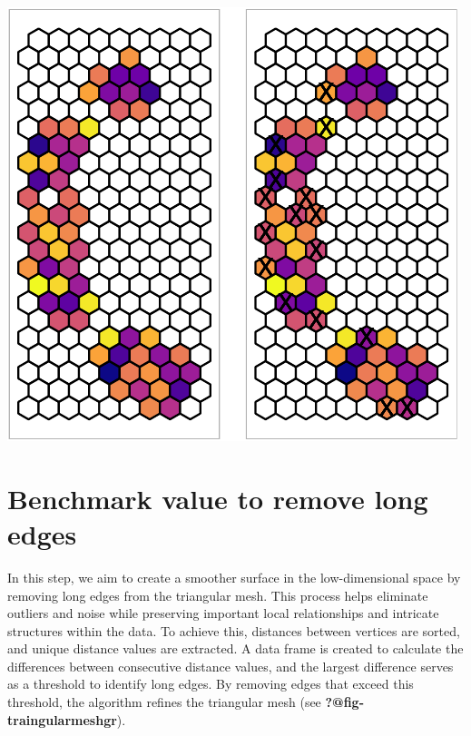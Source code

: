 \documentclass[
  12pt]{article}
\begin{document}
\includegraphics{appendix_files/figure-pdf/unnamed-chunk-15-1.pdf}

\hypertarget{benchmark-value-to-remove-long-edges}{%
\section{Benchmark value to remove long
edges}\label{benchmark-value-to-remove-long-edges}}

In this step, we aim to create a smoother surface in the low-dimensional
space by removing long edges from the triangular mesh. This process
helps eliminate outliers and noise while preserving important local
relationships and intricate structures within the data. To achieve this,
distances between vertices are sorted, and unique distance values are
extracted. A data frame is created to calculate the differences between
consecutive distance values, and the largest difference serves as a
threshold to identify long edges. By removing edges that exceed this
threshold, the algorithm refines the triangular mesh (see
\textbf{?@fig-traingularmeshgr}).
\end{document}

